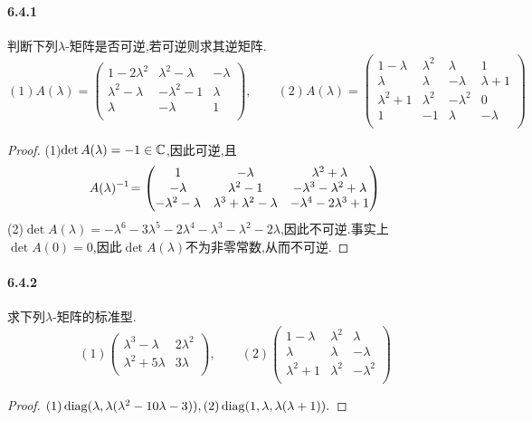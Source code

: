 \documentclass[11pt]{article}
\begin{document}
\paragraph{6.4.1}判断下列$\lambda$-矩阵是否可逆,若可逆则求其逆矩阵.
$$(1)A(\lambda)=\begin{pmatrix}
    1-2 \lambda ^2 & \lambda ^2-\lambda  & -\lambda  \\
    \lambda ^2-\lambda  & -\lambda ^2-1 & \lambda  \\
    \lambda  & -\lambda  & 1 \\
\end{pmatrix}, \qquad (2)A(\lambda)=\begin{pmatrix}
    1-\lambda  & \lambda ^2 & \lambda  & 1 \\
    \lambda  & \lambda  & -\lambda  & \lambda +1 \\
    \lambda ^2+1 & \lambda ^2 & -\lambda ^2 & 0 \\
    1 & -1 & \lambda  & -\lambda  \\
\end{pmatrix}$$
\begin{proof}
    (1)$\det A(\lambda)=-1\in \mathbb{C}$,因此可逆,且
    $$A(\lambda)^{-1}\!=\begin{pmatrix}
        1 & -\lambda  & \lambda ^2+\lambda  \\
        -\lambda  & \lambda ^2-1 & -\lambda ^3-\lambda ^2+\lambda  \\
        -\lambda ^2-\lambda  & \lambda ^3+\lambda ^2-\lambda  &-\lambda^4-2 \lambda ^3+1 \\
    \end{pmatrix}$$
    (2)$\det A(\lambda)=-\lambda ^6-3 \lambda ^5-2 \lambda ^4-\lambda ^3-\lambda ^2-2\lambda$,因此不可逆.事实上$\det A(0)=0$,因此$\det A(\lambda)$不为非零常数,从而不可逆.
\end{proof}
\paragraph{6.4.2}求下列$\lambda$-矩阵的标准型.
$$(1)\begin{pmatrix}
    \lambda ^3-\lambda  & 2 \lambda ^2 \\
    \lambda ^2+5 \lambda  & 3 \lambda  \\
\end{pmatrix} ,\qquad (2)\begin{pmatrix}
    1-\lambda  & \lambda ^2 & \lambda  \\
    \lambda  & \lambda  & -\lambda  \\
    \lambda ^2+1 & \lambda ^2 & -\lambda ^2 \\
\end{pmatrix}$$
\begin{proof}
    $(1)\operatorname{diag}(\lambda, \lambda(\lambda^2-10\lambda-3)), (2)\operatorname{diag}(1,\lambda,\lambda(\lambda+1)).$
\end{proof}
\end{document}
